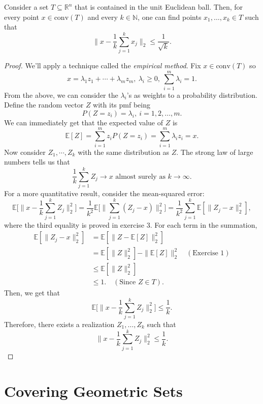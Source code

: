 \begin{theorem}
Consider a set $T \subseteq \mathbb{R}^n$ that is contained in the unit Euclidean ball. Then, for every point 
$x \in \text{conv}(T)$ and every $k \in \mathbb{N}$, one can find points $x_1, \dots, x_k \in T$ such that 
\[ \bigg\| x - \frac{1}{k} \sum_{j = 1}^{k} x_j \bigg\|_2 \leq \frac{1}{\sqrt{k}}. \]
\end{theorem}

\begin{proof}
We'll apply a technique called the \textit{empirical method}. Fix $x \in \text{conv}(T)$ so 
\[ x = \lambda_1 z_1 + \cdots + \lambda_m z_m, \ \lambda_i \geq 0, \ \sum_{i = 1}^{m} \lambda_i = 1. \]
From the above, we can consider the $\lambda_i$'s as weights to a probability distribution. Define the random 
vector $Z$ with its pmf being 
\[ P(Z = z_i) = \lambda_i, \ i = 1, 2, \dots, m. \]
We can immediately get that the expected value of $Z$ is 
\[ \mathbb{E}[Z] = \sum_{i = 1}^{m} z_i P(Z = z_i) = \sum_{i = 1}^{m} \lambda_i z_i = x. \]
Now consider $Z_1, \cdots, Z_k$ with the same distribution as $Z$. The strong law of large numbers tells us that 
\[ \frac{1}{k}\sum_{j = 1}^{k} Z_j \to x \text{  almost surely as  } k \to \infty. \]
For a more quantitative result, consider the mean-squared error:
\[ \mathbb{E}\biggl[ \bigg\| x - \frac{1}{k}\sum_{j = 1}^{k}Z_j \bigg\|_2^2 \biggr] 
= \frac{1}{k^2} \mathbb{E}\biggl[ \bigg\| \sum_{j = 1}^{k} (Z_j - x) \bigg\|_2^2 \biggr] 
= \frac{1}{k^2} \sum_{j = 1}^{k} \mathbb{E}[\| Z_j - x \|_2^2], \]
where the third equality is proved in exercise 3. For each term in the summation, 
\begin{align*}
	\mathbb{E}[\|Z_j - x\|_2^2] 
	&= \mathbb{E}[\|Z - \mathbb{E}[Z]\|_2^2] \\
	&= \mathbb{E}[\|Z\|_2^2] - \|\mathbb{E}[Z]\|_2^2 \quad (\text{Exercise 1}) \\
	&\leq \mathbb{E}[\|Z\|_2^2] \\
	&\leq 1. \quad (\text{Since } Z \in T).
\end{align*}
Then, we get that 
\[ \mathbb{E}\biggl[ \bigg\| x - \frac{1}{k}\sum_{j = 1}^{k}Z_j \bigg\|_2^2 \biggr] \leq \frac{1}{k}. \]
Therefore, there exists a realization $Z_1, \dots, Z_k$ such that 
\[ \bigg\| x - \frac{1}{k}\sum_{j = 1}^{k}Z_j \bigg\|_2^2 \leq \frac{1}{k}. \]
\end{proof}


\section*{Covering Geometric Sets}

